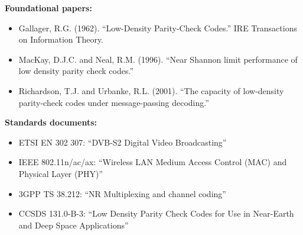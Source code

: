 \textbf{Foundational papers:}
\begin{itemize}
\item Gallager, R.G. (1962). ``Low-Density Parity-Check Codes.'' IRE Transactions on Information Theory.
\item MacKay, D.J.C. and Neal, R.M. (1996). ``Near Shannon limit performance of low density parity check codes.''
\item Richardson, T.J. and Urbanke, R.L. (2001). ``The capacity of low-density parity-check codes under message-passing decoding.''
\end{itemize}

\textbf{Standards documents:}
\begin{itemize}
\item ETSI EN 302 307: ``DVB-S2 Digital Video Broadcasting''
\item IEEE 802.11n/ac/ax: ``Wireless LAN Medium Access Control (MAC) and Physical Layer (PHY)''
\item 3GPP TS 38.212: ``NR Multiplexing and channel coding''
\item CCSDS 131.0-B-3: ``Low Density Parity Check Codes for Use in Near-Earth and Deep Space Applications''
\end{itemize}

